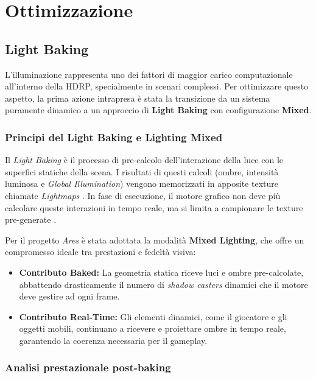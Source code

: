 \chapter{Ottimizzazione}

\section{Light Baking}

L'illuminazione rappresenta uno dei fattori di maggior carico computazionale all'interno della HDRP, specialmente in scenari complessi. Per ottimizzare questo aspetto, la prima azione intrapresa è stata la transizione da un sistema puramente dinamico a un approccio di \textbf{Light Baking} con configurazione \textbf{Mixed}.

\subsection{Principi del Light Baking e Lighting Mixed}

Il \textit{Light Baking} è il processo di pre-calcolo dell'interazione della luce con le superfici statiche della scena. I risultati di questi calcoli (ombre, intensità luminosa e \textit{Global Illumination}) vengono memorizzati in apposite texture chiamate \textit{Lightmaps} \cite{AkenineRealTimeRendering}. In fase di esecuzione, il motore grafico non deve più calcolare queste interazioni in tempo reale, ma si limita a campionare le texture pre-generate \cite{UnityLightBaking, PharrPBRT}.

Per il progetto \textit{Ares} è stata adottata la modalità \textbf{Mixed Lighting}, che offre un compromesso ideale tra prestazioni e fedeltà visiva:
\begin{itemize}
    \item \textbf{Contributo Baked:} La geometria statica riceve luci e ombre pre-calcolate, abbattendo drasticamente il numero di \textit{shadow casters} dinamici che il motore deve gestire ad ogni frame.
    \item \textbf{Contributo Real-Time:} Gli elementi dinamici, come il giocatore e gli oggetti mobili, continuano a ricevere e proiettare ombre in tempo reale, garantendo la coerenza necessaria per il gameplay.
\end{itemize}

\subsection{Analisi prestazionale post-baking}

